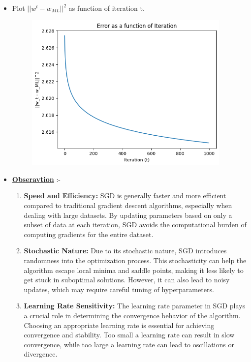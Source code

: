 \documentclass[12pt, a4paper]{article}
\begin{document}
\begin{itemize}
    \item \large Plot \(||w^t-w_{ML}||^2\) as function of iteration t.
    \begin{figure}[ht]
        \centering
        \includegraphics[width=0.95\textwidth]{Stochastic_Gradient_descent}
        \caption{}
    \end{figure}
    \newpage
    \item \large \textbf{\underline{Obseravtion}} :-
    \begin{enumerate}
        \item \textbf{Speed and Efficiency:} SGD is generally faster and more efficient compared to traditional gradient descent algorithms, especially when dealing with large datasets. By updating parameters based on only a subset of data at each iteration, SGD avoids the computational burden of computing gradients for the entire dataset.
        \item \textbf{Stochastic Nature:} \textbf{} Due to its stochastic nature, SGD introduces randomness into the optimization process. This stochasticity can help the algorithm escape local minima and saddle points, making it less likely to get stuck in suboptimal solutions. However, it can also lead to noisy updates, which may require careful tuning of hyperparameters.
        \item \textbf{Learning Rate Sensitivity:} The learning rate parameter in SGD plays a crucial role in determining the convergence behavior of the algorithm. Choosing an appropriate learning rate is essential for achieving convergence and stability. Too small a learning rate can result in slow convergence, while too large a learning rate can lead to oscillations or divergence.

\end{enumerate}
\end{itemize}
\end{document}
